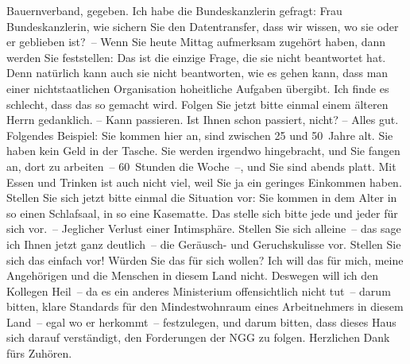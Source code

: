 \documentclass{article}
\begin{document}
Bauernverband, gegeben.  Ich habe die Bundeskanzlerin gefragt: Frau Bundeskanzlerin, wie sichern Sie den Datentransfer, dass wir wissen, wo sie oder er geblieben ist? – Wenn Sie heute Mittag aufmerksam zugehört haben, dann werden Sie feststellen: Das ist die einzige Frage, die sie nicht beantwortet hat.  Denn natürlich kann auch sie nicht beantworten, wie es gehen kann, dass man einer nichtstaatlichen Organisation hoheitliche Aufgaben übergibt. Ich finde es schlecht, dass das so gemacht wird.  Folgen Sie jetzt bitte einmal einem älteren Herrn gedanklich.  – Kann passieren. Ist Ihnen schon passiert, nicht?  – Alles gut. Folgendes Beispiel: Sie kommen hier an, sind zwischen 25 und 50 Jahre alt. Sie haben kein Geld in der Tasche. Sie werden irgendwo hingebracht, und Sie fangen an, dort zu arbeiten – 60 Stunden die Woche –, und Sie sind abends platt. Mit Essen und Trinken ist auch nicht viel, weil Sie ja ein geringes Einkommen haben. Stellen Sie sich jetzt bitte einmal die Situation vor: Sie kommen in dem Alter in so einen Schlafsaal, in so eine Kasematte. Das stelle sich bitte jede und jeder für sich vor. – Jeglicher Verlust einer Intimsphäre. Stellen Sie sich alleine – das sage ich Ihnen jetzt ganz deutlich – die Geräusch- und Geruchskulisse vor. Stellen Sie sich das einfach vor! Würden Sie das für sich wollen? Ich will das für mich, meine Angehörigen und die Menschen in diesem Land nicht.  Deswegen will ich den Kollegen Heil – da es ein anderes Ministerium offensichtlich nicht tut –  darum bitten, klare Standards für den Mindestwohnraum eines Arbeitnehmers in diesem Land – egal wo er herkommt – festzulegen, und darum bitten, dass dieses Haus sich darauf verständigt, den Forderungen der NGG zu folgen. Herzlichen Dank fürs Zuhören. 
\end{document}
